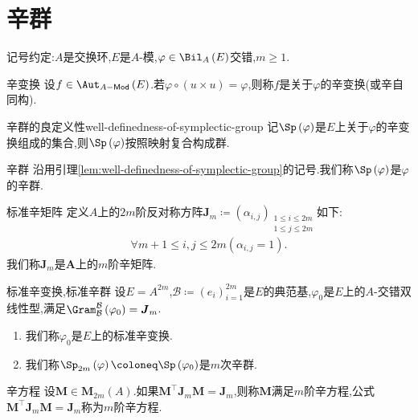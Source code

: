 \section{辛群}

记号约定:$A$是交换环,$E$是$A$-模,$\varphi\in\Bil_{A}\left(E\right)$交错,$m\geq 1$.

\begin{definition}{辛变换}{}
	设$f\in\Aut_{A-\mathsf{Mod}}\left(E\right)$.若$\varphi\circ\left(u\times u\right)=\varphi$,则称$f$是关于$\varphi$的辛变换(或辛自同构).
\end{definition}

\begin{lemma}{辛群的良定义性}{well-definedness-of-symplectic-group}
	记$\Sp\left(\varphi\right)$是$E$上关于$\varphi$的辛变换组成的集合,则$\Sp\left(\varphi\right)$按照映射复合构成群.
\end{lemma}

\begin{definition}{辛群}{}
	沿用引理\ref{lem:well-definedness-of-symplectic-group}的记号.我们称$\Sp\left(\varphi\right)$是$\varphi$的辛群.
\end{definition}

\begin{definition}{标准辛矩阵}{}
	定义$A$上的$2m$阶反对称方阵$\boldsymbol{J}_{m}\coloneq\left(\alpha_{i,j}\right)_{\substack{1\leq i\leq 2m\\ 1\leq j\leq 2m}}$如下:
	\begin{align*}
		\forall m+1\leq i,j\leq 2m\left(\alpha_{i,j}=1\right).
	\end{align*}
	我们称$\boldsymbol{J}_{m}$是$\boldsymbol{A}$上的$m$阶辛矩阵.
\end{definition}

\begin{definition}{标准辛变换,标准辛群}{}
	设$E=A^{2m}$,$\mathcal{B}\coloneq\left(e_{i}\right)_{i=1}^{2m}$是$E$的典范基,$\varphi_{0}$是$E$上的$A$-交错双线性型,满足$\Gram_{\mathcal{B}}^{\mathcal{B}}\left(\varphi_{0}\right)=\boldsymbol{J}_{m}$.
	\begin{enumerate}
		\item 我们称$\varphi_{0}$是$E$上的标准辛变换.
		\item 我们称$\Sp_{2m}\left(\varphi\right)\coloneq\Sp\left(\varphi_{0}\right)$是$m$次辛群.
	\end{enumerate}
\end{definition}

\begin{definition}{辛方程}{}
	设$\boldsymbol{M}\in\mathbf{M}_{2m}\left(A\right)$.如果$\boldsymbol{M}^{\top}\boldsymbol{J}_{m}\boldsymbol{M}=\boldsymbol{J}_{m}$,则称$\boldsymbol{M}$满足$m$阶辛方程,公式$\boldsymbol{M}^{\top}\boldsymbol{J}_{m}\boldsymbol{M}=\boldsymbol{J}_{m}$称为$m$阶辛方程.
\end{definition}

